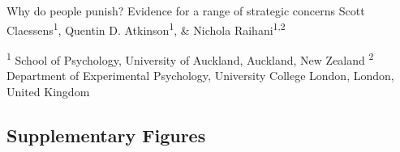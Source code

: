 \documentclass[
  man, donotrepeattitle,floatsintext]{apa6}
\begin{document}
\setcounter{page}{1}
\centering

\noindent \hspace*{10mm} \small Why do people punish? Evidence for a range of strategic concerns \newline
\hspace*{1cm} \small Scott Claessens\textsuperscript{1}, Quentin D. Atkinson\textsuperscript{1}, \& Nichola Raihani\textsuperscript{1,2} \newline

\raggedright

\noindent \footnotesize \textsuperscript{1} School of Psychology, University of Auckland, Auckland, New Zealand \newline
\noindent \footnotesize \textsuperscript{2} Department of Experimental Psychology, University College London, London, United Kingdom \newline

\par

\normalsize
\newpage

\hypertarget{supplementary-figures}{%
\subsection{Supplementary Figures}\label{supplementary-figures}}
\end{document}
